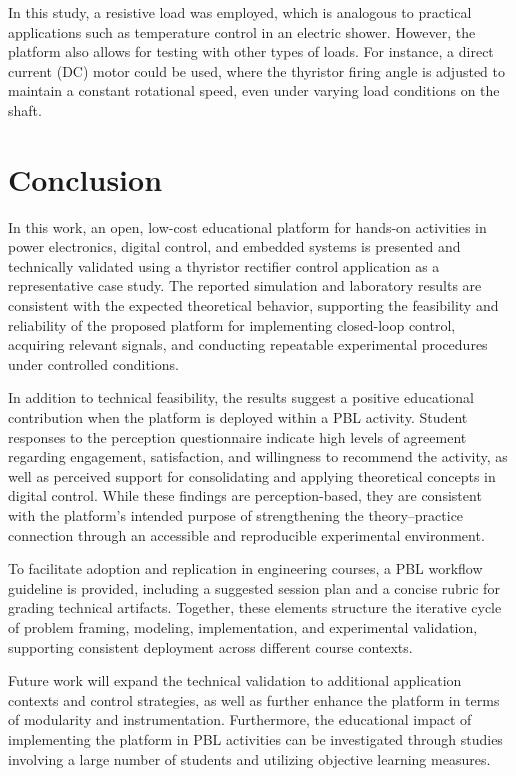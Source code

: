 \documentclass[english]{textolivre}
\begin{document}
In this study, a resistive load was employed, which is analogous to practical applications such as temperature control in an electric shower. However, the platform also allows for testing with other types of loads. For instance, a direct current (DC) motor could be used, where the thyristor firing angle is adjusted to maintain a constant rotational speed, even under varying load conditions on the shaft.

\FloatBarrier
\section{Conclusion}\label{sec-conclusao}

In this work, an open, low-cost educational platform for hands-on activities in power electronics, digital control, and embedded systems is presented and technically validated using a thyristor rectifier control application as a representative case study. The reported simulation and laboratory results are consistent with the expected theoretical behavior, supporting the feasibility and reliability of the proposed platform for implementing closed-loop control, acquiring relevant signals, and conducting repeatable experimental procedures under controlled conditions.

In addition to technical feasibility, the results suggest a positive educational contribution when the platform is deployed within a PBL activity. Student responses to the perception questionnaire indicate high levels of agreement regarding engagement, satisfaction, and willingness to recommend the activity, as well as perceived support for consolidating and applying theoretical concepts in digital control. While these findings are perception-based, they are consistent with the platform’s intended purpose of strengthening the theory–practice connection through an accessible and reproducible experimental environment.

To facilitate adoption and replication in engineering courses, a PBL workflow guideline is provided, including a suggested session plan and a concise rubric for grading technical artifacts. Together, these elements structure the iterative cycle of problem framing, modeling, implementation, and experimental validation, supporting consistent deployment across different course contexts.

Future work will expand the technical validation to additional application contexts and control strategies, as well as further enhance the platform in terms of modularity and instrumentation. Furthermore, the educational impact of implementing the platform in PBL activities can be investigated through studies involving a large number of students and utilizing objective learning measures.
\end{document}
